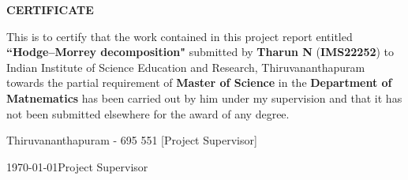 \begin{center}
  {\Large{\bf{CERTIFICATE}}}
\end{center}

\vspace{2em}

This is to certify that the work contained in this project report entitled \textbf{``Hodge--Morrey decomposition"}  submitted by \textbf{Tharun N} (\textbf{IMS22252}) to Indian Institute of Science Education and Research, Thiruvananthapuram towards the partial requirement of {\bf Master of Science} in the \textbf{Department of Matnematics} has been carried out by him under my supervision and that it has not been submitted elsewhere for the award of any degree.


\vspace{3em}

\noindent Thiruvananthapuram - 695 551 \hfill [Project Supervisor]

\noindent \today \hfill Project Supervisor

\clearpage
